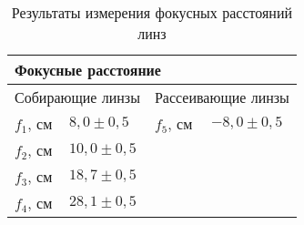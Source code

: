 \documentclass[a4paper,12pt]{article} %
\begin{document}
\begin{table}[h]
\centering
\begin{tabular}{|llll|}

\hline
\multicolumn{4}{|l|}{Фокусные расстояние}                                                                                 \\ \hline
\multicolumn{2}{|l|}{Собирающие линзы}                                  & \multicolumn{2}{l|}{Рассеивающие линзы}         \\ \hline
\multicolumn{1}{|l|}{$f_{1}$, см} & \multicolumn{1}{l|}{$8,0 \pm 0,5$}  & \multicolumn{1}{l|}{$f_{5}$, см} & $-8,0 \pm 0,5$ \\ \hline
\multicolumn{1}{|l|}{$f_{2}$, см} & \multicolumn{1}{l|}{$10,0 \pm 0,5$} & \multicolumn{1}{l|}{}            &              \\ \hline
\multicolumn{1}{|l|}{$f_{3}$, см} & \multicolumn{1}{l|}{$18,7 \pm 0,5$} & \multicolumn{1}{l|}{}            &              \\ \hline
\multicolumn{1}{|l|}{$f_{4}$, см} & \multicolumn{1}{l|}{$28,1 \pm 0,5$} & \multicolumn{1}{l|}{}            &              \\ \hline
\end{tabular}
\caption{Результаты измерения фокусных расстояний линз}
\end{table}
\newpage
\end{document}
